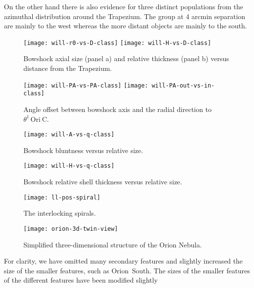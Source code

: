 \documentclass[apj, twocolumn]{aastex63}
\newcommand\thC{\ensuremath{\theta^1\,\mathrm{Ori~C}}}
\begin{document}
On the other hand there is also evidence for three distinct
populations from the azimuthal distribution around the Trapezium.
The group at 4 arcmin separation are mainly to the west whereas
the more distant objects are mainly to the south.


\begin{figure}
  \centering
  \texttt{[image: will-r0-vs-D-class]}
  \texttt{[image: will-H-vs-D-class]}
  \caption{Bowshock axial size (panel a) and relative thickness (panel b) versus distance from the Trapezium.}
  \label{fig:size-v-distance}
\end{figure}
\begin{figure}
  \centering
  \texttt{[image: will-PA-vs-PA-class]}
  \texttt{[image: will-PA-out-vs-in-class]}
  \caption{Angle offset between bowshock axis and the radial direction to \thC{}.}
  \label{fig:PA-v-PA}
\end{figure}
\begin{figure}
  \centering
  \texttt{[image: will-A-vs-q-class]}
  \caption{Bowshock bluntness versus relative size.}
  \label{fig:A-v-q}
\end{figure}
\begin{figure}
  \centering
  \texttt{[image: will-H-vs-q-class]}
  \caption{Bowshock relative shell thickness versus relative size.}
  \label{fig:H-v-q}
\end{figure}

\begin{figure}
  \centering
  \texttt{[image: ll-pos-spiral]}
  \caption{The interlocking spirals.}
  \label{fig:spiral-bars}
\end{figure}

\begin{figure*}
  \centering
  \texttt{[image: orion-3d-twin-view]}
  \caption{Simplified three-dimensional structure of the Orion Nebula.}
  \label{fig:3d-twin}
\end{figure*}

For clarity, we have omitted many secondary features and slightly
increased the size of the smaller features, such as Orion~South. 
The sizes of the smaller features  of the different features have been
modified slightly


\end{document}
